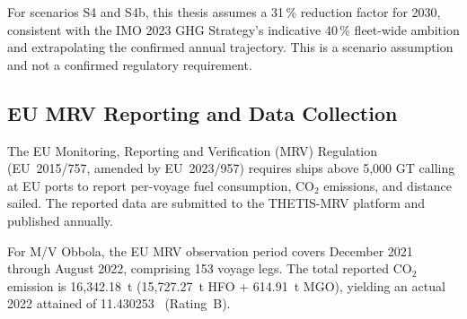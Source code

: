 For scenarios S4 and S4b, this thesis assumes a 31\,\% reduction factor
for 2030, consistent with the IMO 2023 GHG Strategy's indicative 40\,\%
fleet-wide ambition and extrapolating the confirmed annual trajectory.
This is a scenario assumption and not a confirmed regulatory requirement.

\subsection{EU MRV Reporting and Data Collection}
\label{app:cii:mrv}

The EU Monitoring, Reporting and Verification (MRV) Regulation
(EU~2015/757, amended by EU~2023/957) requires ships above 5{,}000 GT
calling at EU ports to report per-voyage fuel consumption, CO$_2$
emissions, and distance sailed.  The reported data are submitted to the
THETIS-MRV platform and published annually.

For M/V Obbola, the EU MRV observation period covers December 2021
through August 2022, comprising 153 voyage legs.  The total reported
CO$_2$ emission is 16{,}342.18~t (15{,}727.27~t HFO + 614.91~t MGO),
yielding an actual 2022 attained \CII{} of 11.430253~\gGTnm{}
(Rating~B).
